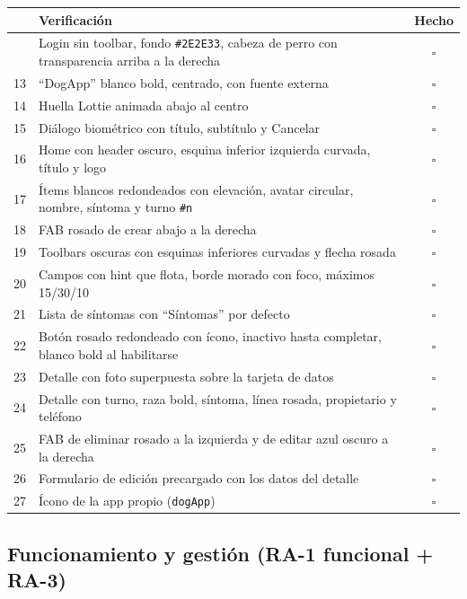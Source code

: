 \documentclass[11pt,letterpaper]{article}
\newcommand{\hex}[1]{\texttt{\##1}}
\newcommand{\code}[1]{\texttt{\small #1}}
\begin{document}
\begin{center}
\small
\begin{xltabular}{\linewidth}{@{}c X c@{}}
\toprule
& \textbf{Verificaci\'on} & \textbf{Hecho}\\
\midrule
\endhead
\bottomrule
{} & Login sin toolbar, fondo \hex{2E2E33}, cabeza de perro con transparencia arriba a la derecha & $\square$\\
13 & ``DogApp'' blanco bold, centrado, con fuente externa & $\square$\\
14 & Huella Lottie animada abajo al centro & $\square$\\
15 & Di\'alogo biom\'etrico con t\'itulo, subt\'itulo y Cancelar & $\square$\\
16 & Home con header oscuro, esquina inferior izquierda curvada, t\'itulo y logo & $\square$\\
17 & \'Items blancos redondeados con elevaci\'on, avatar circular, nombre, s\'intoma y turno \code{\#n} & $\square$\\
18 & FAB rosado de crear abajo a la derecha & $\square$\\
19 & Toolbars oscuras con esquinas inferiores curvadas y flecha rosada & $\square$\\
20 & Campos con hint que flota, borde morado con foco, m\'aximos 15/30/10 & $\square$\\
21 & Lista de s\'intomas con ``S\'intomas'' por defecto & $\square$\\
22 & Bot\'on rosado redondeado con \'icono, inactivo hasta completar, blanco bold al habilitarse & $\square$\\
23 & Detalle con foto superpuesta sobre la tarjeta de datos & $\square$\\
24 & Detalle con turno, raza bold, s\'intoma, l\'inea rosada, propietario y tel\'efono & $\square$\\
25 & FAB de eliminar rosado a la izquierda y de editar azul oscuro a la derecha & $\square$\\
26 & Formulario de edici\'on precargado con los datos del detalle & $\square$\\
27 & \'Icono de la app propio (\code{dogApp}) & $\square$\\
\end{xltabular}
\end{center}
\newpage

\subsection{Funcionamiento y gesti\'on (RA-1 funcional + RA-3)}
\end{document}
